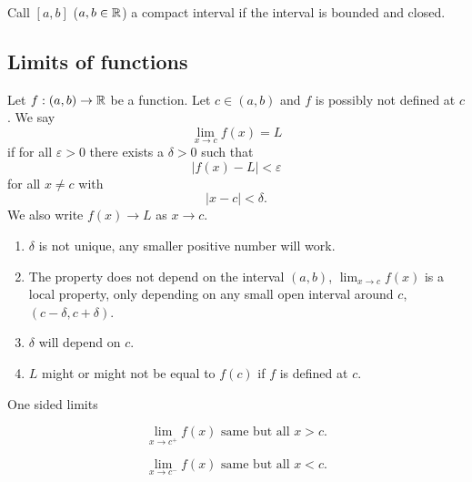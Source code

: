 \documentclass[10pt, a4paper]{article}
\begin{document}
\begin{definition}
    Call $[a, b]$
    ($a, b \in \mathbb{R}$)
    a compact interval if the interval is bounded and closed.
\end{definition}

\subsection{Limits of functions}

\begin{definition}
    Let $f : (a, b) \rightarrow \mathbb{R}$ be a function.
    Let $c \in (a, b)$ and $f$ is possibly not defined at $c$.
    We say
    \[
    \lim_{x \rightarrow c}f(x) = L
    \]
    if for all $\varepsilon > 0$ there exists a $\delta > 0$ such that
    \[
    |f(x) - L| < \varepsilon
    \]
    for all $x \neq c$ with
    \[
    |x - c| < \delta.
    \]
    We also write $f(x) \rightarrow L$ as $x \rightarrow c$.
\end{definition}

\begin{remark}
    \begin{enumerate}[label = (\roman*)]
        \item $\delta$ is not unique,
        any smaller positive number will work.

        \item The property does not depend on the interval $(a, b)$,
        $\lim_{x \rightarrow c}f(x)$ is a local property,
        only depending on any small open interval around $c$,
        $(c - \delta, c + \delta)$.

        \item $\delta$ will depend on $c$.

        \item $L$ might or might not be equal to $f(c)$ if $f$ is defined at $c$.
    \end{enumerate}
\end{remark}

One sided limits

\begin{definition}
    \[
    \lim_{x \rightarrow c ^ {+}}f(x) \text{ same but all } x > c.
    \]
\end{definition}


\begin{definition}
    \[
    \lim_{x \rightarrow c ^ {-}}f(x) \text{ same but all } x < c.
    \]
\end{definition}
\end{document}
